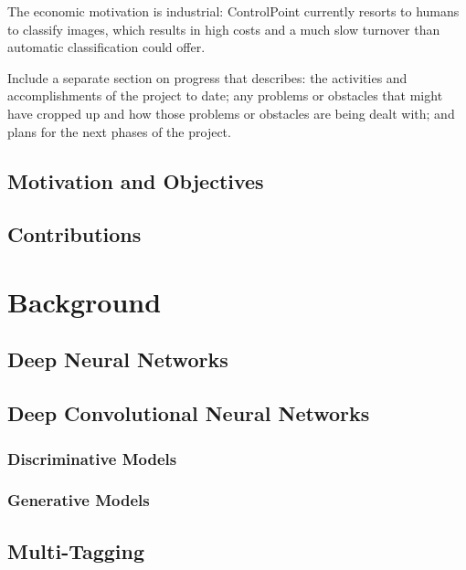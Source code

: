 \documentclass[a4paper,11pt]{article}
\begin{document}
\par The economic motivation is industrial: ControlPoint currently resorts to humans to classify images, which results in high costs and a much slow turnover than automatic classification could offer.\\ 

\par Include a separate section on progress that describes: the activities and accomplishments of the project to date; any problems or obstacles that might have cropped up and how those problems or obstacles are being dealt with; and plans for the next phases of the project.\\ 


\subsection{Motivation and Objectives}


\subsection{Contributions}

\clearpage
\section{Background}

\subsection{Deep Neural Networks}




\subsection{Deep Convolutional Neural Networks}

\subsubsection{Discriminative Models}

\subsubsection{Generative Models}


\subsection{Multi-Tagging}
\end{document}
